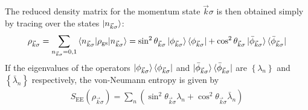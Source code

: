 \documentclass[prb]{revtex4-2}
\begin{document}
The reduced density matrix for the momentum state \(\vec k\sigma\) is then obtained simply by tracing over the states \(\ket{n_{\vec k\sigma}}\):
\begin{equation}\begin{aligned}
	\rho_{\vec k\sigma} = \sum_{n_{\vec k\sigma}=0,1} \braket{n_{\vec k\sigma} | \rho_\text{gs} | n_{\vec k\sigma}} = \sin^2\theta_{\vec k\sigma} \ket{\phi_{\vec k\sigma}}\bra{\phi_{\vec k\sigma}} + \cos^2\theta_{\vec k\sigma} \ket{\bar\phi_{\vec k\sigma}}\bra{\bar\phi_{\vec k\sigma}}\label{red_matrix}
\end{aligned}\end{equation}
If the eigenvalues of the operators \(\ket{\phi_{\vec k\sigma}}\bra{\phi_{\vec k\sigma}}\) and \(\ket{\bar\phi_{\vec k\sigma}}\bra{\bar\phi_{\vec k\sigma}}\) are \(\left\{ \lambda_n \right\} \) and \(\left\{ \bar\lambda_n \right\} \) respectively, the von-Neumann entropy is given by
\begin{equation}\begin{aligned}
	S_\text{EE}\left(\rho_{\vec k\sigma}\right) = \sum_n \left( \sin^2\theta_{\vec k\sigma}\lambda_n + \cos^2\theta_{\vec k\sigma}\bar\lambda_n \right) 
\end{aligned}\end{equation}
\end{document}
